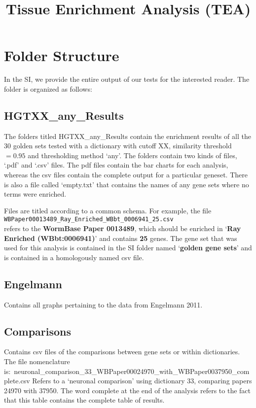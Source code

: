 \documentclass{article}
\begin{document}

\title{Tissue Enrichment Analysis (TEA)}


\section*{Folder Structure}

In the SI, we provide the entire output of our tests for the interested reader. The folder is organized as follows:

\subsection*{HGTXX\_any\_Results}
The folders titled HGTXX\_any\_Results contain the enrichment results of all the 30 golden sets tested with a dictionary with cutoff XX, similarity threshold $=0.95$ and thresholding method `any'. The folders contain two kinds of files, `.pdf' and `.csv' files. The pdf files contain the bar charts for each analysis, whereas the csv files contain the complete output for a particular geneset. There is also a file called `empty.txt' that contains the names of any gene sets where no terms were enriched.

Files are titled according to a common schema. For example, the file \\
\texttt{WBPaper00013489\_Ray\_Enriched\_WBbt\_0006941\_25.csv}\\
refers to the \textbf{WormBase Paper 0013489}, which should be enriched in `\textbf{Ray Enriched (WBbt:0006941)}' and contains \textbf{25} genes. The gene set that was used for this analysis is contained in the SI folder named `\textbf{golden gene sets}' and is contained in a homologously named csv file. 

\subsection*{Engelmann}
	Contains all graphs pertaining to the data from Engelmann 2011. 

\subsection*{Comparisons}
	Contains csv files of the comparisons between gene sets or within dictionaries. The file nomenclature is:\
neuronal\_comparison\_33\_WBPaper00024970\_with\_WBPaper0037950\_complete.csv
Refers to a `neuronal comparison' using dictionary 33, comparing papers 24970 with 37950. The word complete at the end of the analysis refers to the fact that this table contains the complete table of results. 
\end{document}
